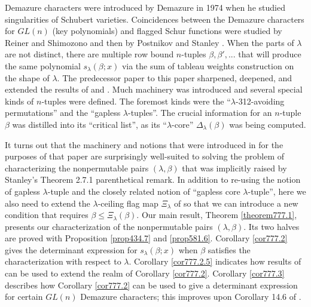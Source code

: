 \documentclass[11pt]{article}
\theoremstyle{definition}
\theoremstyle{remark}
\numberwithin{equation}{section}
\begin{document}
\begin{spacing}{1.35}
Demazure characters were introduced by Demazure in 1974 when he studied singularities of Schubert varieties.  Coincidences between the Demazure characters for $GL(n)$ (key polynomials) and flagged Schur functions were studied by Reiner and Shimozono \cite{RS} and then by Postnikov and Stanley \cite{PS}.  When the parts of $\lambda$ are not distinct, there are multiple row bound $n$-tuples $\beta, \beta', ...$ that will produce the same polynomial $s_\lambda(\beta;x)$ via the sum of tableau weights construction on the shape of $\lambda$.  The predecessor paper to this paper sharpened, deepened, and extended the results of \cite{RS} and \cite{PS}.  Much machinery was introduced and several special kinds of $n$-tuples were defined.  The foremost kinds were the ``$\lambda$-312-avoiding permutations'' and the ``gapless $\lambda$-tuples''.  The crucial information for an $n$-tuple $\beta$ was distilled into its ``critical list'', as its ``$\lambda$-core'' $\Delta_\lambda(\beta)$ was being computed.



It turns out that the machinery and notions that were introduced in \cite{PW} for the purposes of that paper are surprisingly well-suited to solving the problem of characterizing the nonpermutable pairs $(\lambda, \beta)$ that was implicitly raised by Stanley's Theorem 2.7.1 parenthetical remark.  In addition to re-using the notion of gapless $\lambda$-tuple and the closely related notion of ``gapless core $\lambda$-tuple'', here we also need to extend the $\lambda$-ceiling flag map $\Xi_\lambda$ of \cite{PW} so that we can introduce a new condition that requires $\beta \leq \Xi_\lambda(\beta)$.  Our main result, Theorem \ref{theorem777.1}, presents our characterization of the nonpermutable pairs $(\lambda, \beta)$.  Its two halves are proved with Proposition \ref{prop434.7} and \ref{prop581.6}.  Corollary \ref{cor777.2} gives the determinant expression for $s_\lambda(\beta;x)$ when $\beta$ satisfies the characterization with respect to $\lambda$.  Corollary \ref{cor777.2.5} indicates how results of \cite{PW} can be used to extend the realm of Corollary \ref{cor777.2}.  Corollary \ref{cor777.3} describes how Corollary \ref{cor777.2} can be used to give a determinant expression for certain $GL(n)$ Demazure characters;  this improves upon Corollary 14.6 of \cite{PS}.




\end{spacing}
\end{document}
